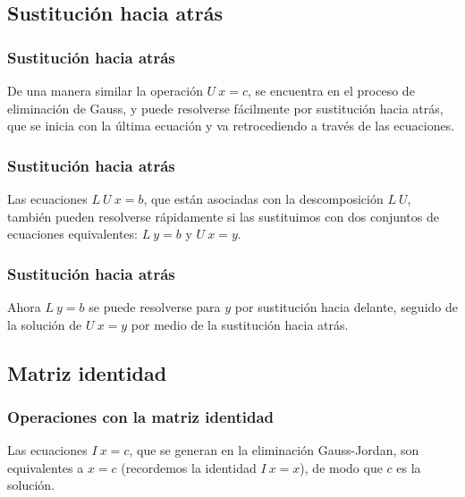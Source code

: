 \subsection*{Sustitución hacia atrás}
\begin{frame}
\frametitle{Sustitución hacia atrás}
De una manera similar la operación $U \: x = c$, se encuentra en el proceso de eliminación de Gauss, y puede resolverse fácilmente por sustitución hacia atrás, que se inicia con la última ecuación y va retrocediendo a través de las ecuaciones.
\end{frame}
\begin{frame}
\frametitle{Sustitución hacia atrás}
Las ecuaciones $L \: U \: x = b$, que están asociadas con la descomposición $L \: U$, también pueden resolverse rápidamente si las sustituimos con dos conjuntos de ecuaciones equivalentes: $L \: y = b$ y $U \: x = y$.
\end{frame}
\begin{frame}
\frametitle{Sustitución hacia atrás}
Ahora $L \: y = b$ se puede resolverse para $y$ por sustitución hacia delante, seguido de la solución de $U \: x = y$ por medio de la sustitución hacia atrás.
\end{frame}
\subsection*{Matriz identidad}
\begin{frame}
\frametitle{Operaciones con la matriz identidad}
Las ecuaciones $I \: x = c$, que se generan en la eliminación Gauss-Jordan, son equivalentes a $x = c$ (recordemos la identidad $I \: x = x$), de modo que $c$ es la solución.
\end{frame}
